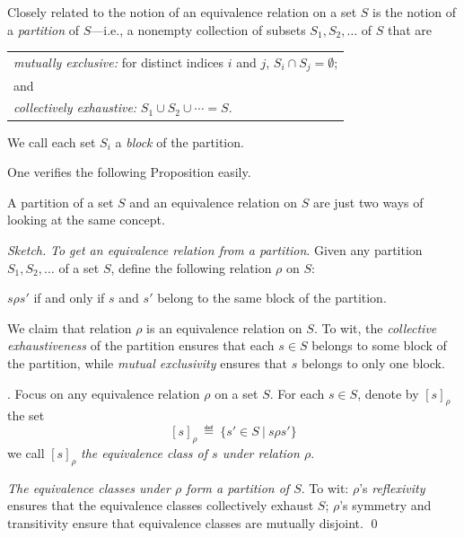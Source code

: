 \noindent
Closely related to the notion of an equivalence relation on a set $S$
is the notion of a {\it partition} 
 of $S$---i.e., a nonempty collection of subsets
$S_1, S_2, \ldots$ of $S$ that are

\smallskip

\begin{tabular}{l}
{\em mutually exclusive:}
for distinct indices $i$ and $j$, $S_i \cap S_j = \emptyset$; \\
and  \\
{\em collectively exhaustive:}
$S_1 \cup S_2 \cup \cdots = S$.
\end{tabular}

\smallskip

\noindent
We call each set $S_i$ a {\it block} of the partition. 
 

\noindent
One verifies the following Proposition easily.

\begin{prop}
A partition of a set $S$ and an equivalence relation on $S$ are just
two ways of looking at the same concept.
\end{prop}

\begin{proof}[Sketch]
{\it To get an equivalence relation from a partition}.
Given any partition $S_1, S_2, \ldots$ of a set $S$, define the
following relation $\rho$ on $S$:

$s \rho s'$ if and only if $s$ and $s'$ belong to the same block of the
partition.

\noindent
We claim that relation $\rho$ is an equivalence relation on $S$.  To
wit, the {\em collective exhaustiveness} of the partition ensures that
each $s \in S$ belongs to some block of the partition, while {\em
  mutual exclusivity} ensures that $s$ belongs to only one block.

.
Focus on any equivalence relation $\rho$ on a set
$S$.  For each $s \in S$, denote by $[s]_\rho$ the set
\[ [s]_\rho \ \eqdef \ \{ s' \in S \ | \ s \rho s' \} \]
we call $[s]_\rho$ {\it the equivalence class of $s$ under relation
$\rho$}.

\noindent
{\em The equivalence classes under $\rho$ form a partition of $S$}.
To wit: $\rho$'s {\em reflexivity} ensures that the equivalence classes
collectively exhaust $S$; $\rho$'s symmetry and transitivity ensure that
equivalence classes are mutually disjoint.  \qed
\end{proof}

